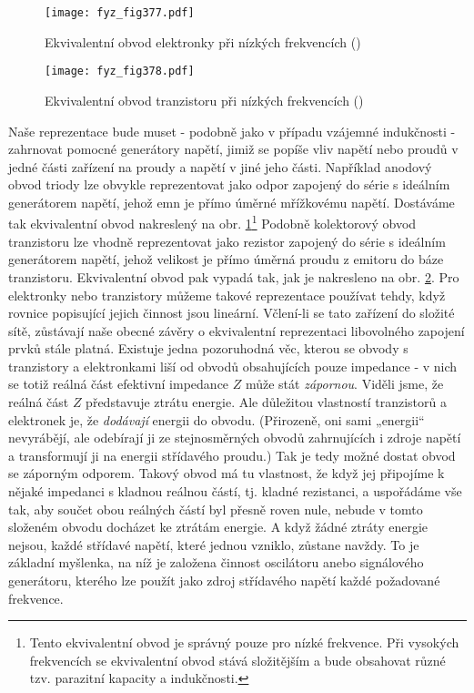   \begin{figure}[ht!] %
    \centering
    \texttt{[image: fyz\_fig377.pdf]}
    \caption{Ekvivalentní obvod elektronky při nízkých frekvencích
             (\cite[s.~415]{Feynman02})}
    \label{fyz:fig377}
  \end{figure}

  \begin{figure}[ht!] %
    \centering
    \texttt{[image: fyz\_fig378.pdf]}
    \caption{Ekvivalentní obvod tranzistoru při nízkých frekvencích
             (\cite[s.~415]{Feynman02})}
    \label{fyz:fig378}
  \end{figure}
  
  Naše reprezentace bude muset - podobně jako v případu vzájemné indukčnosti - zahrnovat pomocné 
  generátory napětí, jimiž se popíše vliv napětí nebo proudů v jedné části zařízení na proudy a 
  napětí v jiné jeho části. Například anodový obvod triody lze obvykle reprezentovat jako odpor 
  zapojený do série s ideálním generátorem napětí, jehož emn je přímo úměrné mřížkovému napětí. 
  Dostáváme tak ekvivalentní obvod nakreslený na obr. \ref{fyz:fig377}\footnote{Tento ekvivalentní 
  obvod je správný pouze pro nízké frekvence. Při vysokých frekvencích se ekvivalentní obvod stává 
  složitějším a bude obsahovat různé tzv. parazitní kapacity a indukčnosti.} Podobně kolektorový 
  obvod tranzistoru lze vhodně reprezentovat jako rezistor zapojený do série s ideálním generátorem 
  napětí, jehož velikost je přímo úměrná proudu z emitoru do báze tranzistoru. Ekvivalentní
  obvod pak vypadá tak, jak je nakresleno na obr. \ref{fyz:fig378}. Pro elektronky nebo tranzistory 
  můžeme takové reprezentace používat tehdy, když rovnice popisující jejich činnost jsou lineární. 
  Včlení-li se tato zařízení do složité sítě, zůstávají naše obecné závěry o ekvivalentní 
  reprezentaci libovolného zapojení prvků stále platná. Existuje jedna pozoruhodná věc, kterou se 
  obvody s tranzistory a elektronkami liší od obvodů obsahujících pouze impedance - v nich se totiž 
  reálná část efektivní impedance \(Z\) může stát \emph{zápornou}. Viděli jsme, že reálná část 
  \(Z\) představuje ztrátu energie. Ale důležitou vlastností tranzistorů a elektronek je, že 
  \emph{dodávají} energii do obvodu. (Přirozeně, oni sami „energii“ nevyrábějí, ale odebírají ji ze 
  stejnosměrných obvodů zahrnujících i zdroje napětí a transformují ji na energii střídavého 
  proudu.) Tak je tedy možné dostat obvod se záporným odporem. Takový obvod má tu vlastnost, že 
  když jej připojíme k nějaké impedanci s kladnou reálnou částí, tj. kladné rezistanci, a 
  uspořádáme vše tak, aby součet obou reálných částí byl přesně roven nule, nebude v tomto složeném 
  obvodu docházet ke ztrátám energie. A když žádné ztráty energie nejsou, každé střídavé napětí, 
  které jednou vzniklo, zůstane navždy. To je základní myšlenka, na níž je založena činnost 
  oscilátoru anebo signálového generátoru, kterého lze použít jako zdroj střídavého napětí každé 
  požadované frekvence.
  

